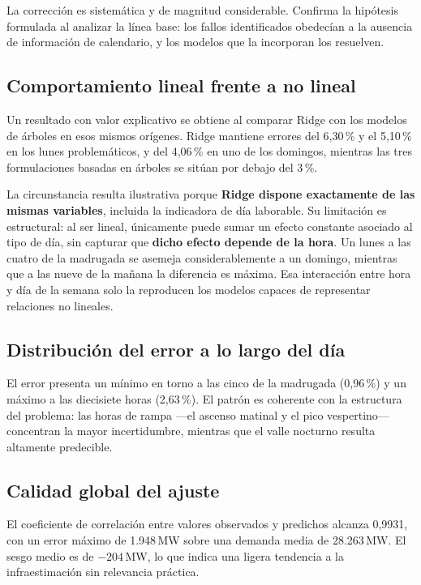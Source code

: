 La corrección es sistemática y de magnitud considerable. Confirma la hipótesis
formulada al analizar la línea base: los fallos identificados obedecían a la
ausencia de información de calendario, y los modelos que la incorporan los
resuelven.

\subsection*{Comportamiento lineal frente a no lineal}

Un resultado con valor explicativo se obtiene al comparar Ridge con los modelos de
árboles en esos mismos orígenes. Ridge mantiene errores del 6,30\,\% y el 5,10\,\%
en los lunes problemáticos, y del 4,06\,\% en uno de los domingos, mientras las
tres formulaciones basadas en árboles se sitúan por debajo del 3\,\%.

La circunstancia resulta ilustrativa porque \textbf{Ridge dispone exactamente de
las mismas variables}, incluida la indicadora de día laborable. Su limitación es
estructural: al ser lineal, únicamente puede sumar un efecto constante asociado al
tipo de día, sin capturar que \textbf{dicho efecto depende de la hora}. Un lunes a
las cuatro de la madrugada se asemeja considerablemente a un domingo, mientras que
a las nueve de la mañana la diferencia es máxima. Esa interacción entre hora y día
de la semana solo la reproducen los modelos capaces de representar relaciones no
lineales.

\subsection*{Distribución del error a lo largo del día}

El error presenta un mínimo en torno a las cinco de la madrugada (0,96\,\%) y un
máximo a las diecisiete horas (2,63\,\%). El patrón es coherente con la estructura
del problema: las horas de rampa —el ascenso matinal y el pico vespertino—
concentran la mayor incertidumbre, mientras que el valle nocturno resulta
altamente predecible.

\subsection*{Calidad global del ajuste}

El coeficiente de correlación entre valores observados y predichos alcanza 0,9931,
con un error máximo de 1.948\,MW sobre una demanda media de 28.263\,MW. El sesgo
medio es de $-204$\,MW, lo que indica una ligera tendencia a la infraestimación sin
relevancia práctica.


